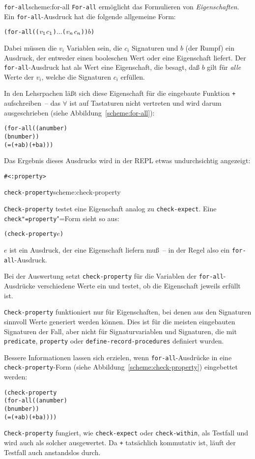 \begin{feature}{\texttt{for-all}}{scheme:for-all}
  \texttt{For-all} ermöglicht das
  Formulieren von \textit{Eigenschaften}.  Ein
  \texttt{for-all}-Ausdruck hat die folgende allgemeine Form:
%
\begin{alltt}
(for-all ((\(v\sb{1}\) \(c\sb{1}\)) \(\ldots\) (\(v\sb{n}\) \(c\sb{n}\))) \(b\))
\end{alltt}
%
Dabei müssen die $v_i$ Variablen sein, die $c_i$ Signaturen und $b$ (der
Rumpf) ein Ausdruck, der entweder einen booleschen Wert oder eine
Eigenschaft liefert.  Der \texttt{for-all}-Ausdruck hat als Wert eine
Eigenschaft, die besagt, daß \(b\) gilt für \emph{alle} Werte der
$v_i$, welche die Signaturen $c_i$ erfüllen.
\end{feature}

In den Lehsrpachen läßt sich diese Eigenschaft für die eingebaute Funktion
\texttt{+} aufschreiben~-- das $\forall$ ist auf
Tastaturen nicht vertreten und wird darum ausgeschrieben (siehe
Abbildung~\ref{scheme:for-all}):
%
\begin{alltt}
(for-all ((a number)
          (b number))
  (= (+ a b) (+ b a)))
\end{alltt}
%
Das Ergebnis dieses Ausdrucks wird in der REPL etwas undurchsichtig
angezeigt:
%
\begin{alltt}
\evalsto{} #<:property>
\end{alltt}
%
\begin{feature}{\texttt{check-property}}{scheme:check-property}

\texttt{Check-property}
testet eine Eigenschaft analog zu \texttt{check-expect}.  Eine
\texttt{check"=property}"=Form sieht so aus:
%
\begin{alltt}
(check-property \(e\)) 
\end{alltt}
%
$e$ ist ein Ausdruck, der eine Eigenschaft liefern muß~-- in der Regel
also ein \texttt{for-all}-Ausdruck.

Bei der Auswertung setzt \texttt{check-property} für die Variablen der
\texttt{for-all}-Ausdrücke verschiedene Werte ein und testet, ob die
Eigenschaft jeweils erfüllt ist.

\texttt{Check-property} funktioniert nur für Eigenschaften, bei denen
aus den Signaturen sinnvoll Werte generiert werden können.  Dies ist
für die meisten eingebauten Signaturen der Fall, aber nicht für
Signaturvariablen und Signaturen, die mit \texttt{predicate},
\texttt{property} oder \texttt{define-record-procedures} definiert
wurden.
\end{feature}
%
Bessere Informationen lassen sich erzielen, wenn \texttt{for-all}-Ausdrücke in
eine  \texttt{check-property}-Form
(siehe Abbildung~\ref{scheme:check-property}) eingebettet werden:
%
\begin{alltt}
(check-property
  (for-all ((a number)
            (b number))
    (= (+ a b) (+ b a))))
\end{alltt}
%
\texttt{Check-property} fungiert, wie \texttt{check-expect} oder
\texttt{check-within}, als Testfall und wird auch als solcher
ausgewertet.  Da \texttt{+} tatsächlich kommutativ ist, läuft der
Testfall auch anstandslos durch.

